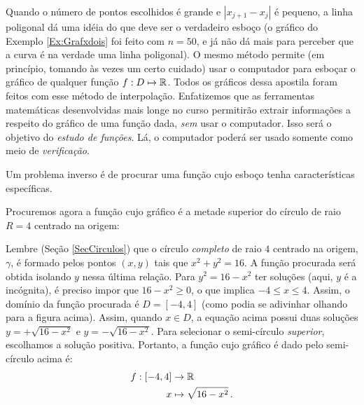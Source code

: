 \begin{obs}
\begin{center}
\begin{bmlimage}
\begin{tikzpicture}[scale=0.7]
\end{tikzpicture}\end{bmlimage}
\end{center}
Quando o número de pontos escolhidos é grande e  
 $|x_{j+1}-x_j|$ é pequeno, a linha poligonal dá uma idéia do que deve ser o verdadeiro
esboço (o gráfico do Exemplo \ref{Ex:Grafxdois} foi feito com $n=50$, e já não dá mais
para perceber que a curva é na verdade uma linha poligonal).
O mesmo método permite (em princípio, tomando às vezes um certo cuidado) usar o computador
para esboçar o gráfico de qualquer função $f:D\mapsto \bR$.
Todos os gráficos dessa apostila foram feitos com esse método de interpolação. 
Enfatizemos que as ferramentas matemáticas desenvolvidas mais longe no curso 
permitirão extrair informações a respeito do
gráfico de uma função dada, \emph{sem} usar o computador. Isso será o objetivo do
\emph{estudo de funções}.
Lá, o computador poderá ser usado somente como meio de \emph{verificação}.
\end{obs}


Um problema inverso é de procurar uma função cujo esboço tenha características
específicas.
\begin{ex}
 Procuremos agora a função cujo gráfico é a metade superior do círculo de raio $R=4$
centrado na origem:
\begin{center}
\begin{bmlimage}\end{bmlimage}
\end{center}

 Lembre (Seção \ref{SecCirculos}) que o círculo \emph{completo} de raio $4$ centrado na
origem, $\gamma$, é formado pelos pontos $(x,y)$ tais que $x^2+y^2=16$. 
 A função procurada será obtida isolando $y$ nessa última relação. Para $y^2=16-x^2$ ter
soluções (aqui, $y$ é a incógnita), 
é preciso impor que $16-x^2\geq 0$, o que implica $-4\leq x\leq 4$. 
 Assim, o domínio da função procurada é $D=[-4,4]$ (como podia se adivinhar olhando para a
figura acima). 
 Assim, quando $x\in D$, a equação acima possui duas soluções $y=+\sqrt{16-x^2}$ e
$y=-\sqrt{16-x^2}$. Para selecionar o semi-círculo \emph{superior}, escolhamos a solução
positiva. Portanto, a função cujo gráfico é dado pelo semi-círculo acima é:
\begin{align*}
f:[-4,4]&\to\bR\\
x&\mapsto \sqrt{16-x^2}\,.
\end{align*}
\end{ex}

